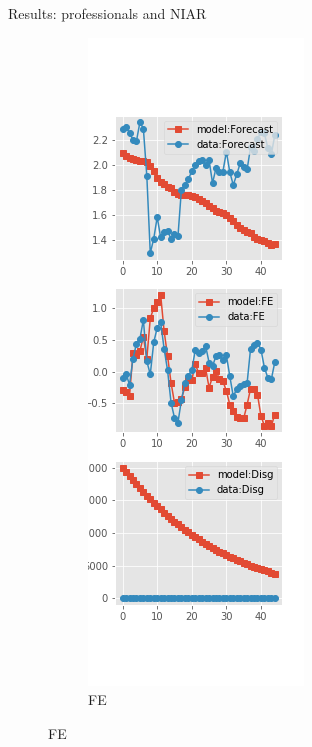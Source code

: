\documentclass{beamer}
\begin{document}
\begin{frame}{Results: professionals and NIAR}
\begin{figure}[ht]
\begin{subfigure}[b]{0.19\textwidth}
		\end{subfigure}
		\hfill
		\begin{subfigure}[b]{0.19\textwidth}
			\caption{FE}
			\includegraphics[width=\textwidth, height = 0.8\textheight]{figuresDraft/spf_ni_est_diag1.png}

\end{subfigure}
\end{figure}
\end{frame}
\end{document}
